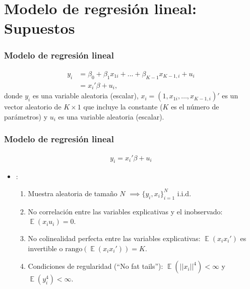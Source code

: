\documentclass[t, compress, spanish, aspectratio=169]{beamer}
\DeclareMathOperator{\E}{\mathbb{E}}
\newcommand{\term}[1]{\structure{\textbf{#1}}} %
\begin{document}
	\section{Modelo de regresi\'on lineal: Supuestos}
	\begin{frame}
		\frametitle{Modelo de regresi\'on lineal}
 			\begin{align*}
				y_i&=\beta_0 + \beta_1 x_{1i} + ...+\beta_{K-1}  x_{K-1,i}+u_i \\
				&= x_i'\beta+u_i,
			\end{align*}
			donde $y_i$ es una variable aleatoria (escalar), $x_i=(1,x_{1i},\dots,x_{K-1,i})'$ es un vector aleatorio de $K \times 1$ que incluye la constante ($K$ es el n\'umero de par\'ametros) y $u_i$ es una variable aleatoria (escalar).
	\end{frame}
	\begin{frame}
		\frametitle{Modelo de regresi\'on lineal}
 			\begin{align*}
				y_i = x_i'\beta+u_i
			\end{align*}
		\begin{itemize}
 			\item \term{Supuestos}:
			\begin{enumerate}
				\bigskip
				\item [OLS1] Muestra aleatoria de tama\~no $N$ $\implies \{y_i,x_i\}_{i=1}^N$ i.i.d.
				\bigskip
				\item [OLS2]  No correlaci\'on entre las variables explicativas y el inobservado: $\E(x_iu_i)=0$.
				\bigskip
				\item [OLS3]  No colinealidad perfecta entre las variables explicativas: $\E(x_ix_i')$ es invertible o $\text{rango}(\E(x_ix_i'))=K$.
				\bigskip
				\item [OLS4]  Condiciones de regularidad (``No fat tails''): $\E(||x_i||^4)<\infty$ y $\E(y_i^4)<\infty$.
			\end{enumerate}
		\end{itemize}
	\end{frame}
\end{document}
